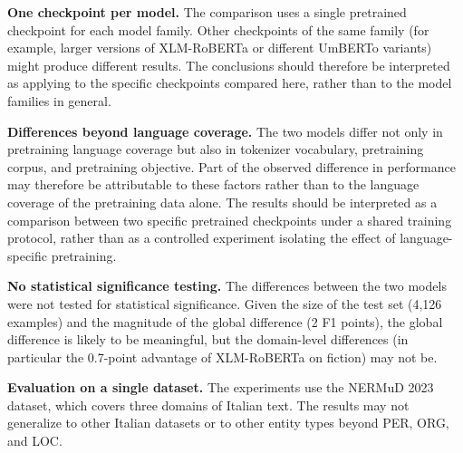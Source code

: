 \textbf{One checkpoint per model.} The comparison uses a single pretrained checkpoint for each model family. Other checkpoints of the same family (for example, larger versions of XLM-RoBERTa or different UmBERTo variants) might produce different results. The conclusions should therefore be interpreted as applying to the specific checkpoints compared here, rather than to the model families in general.

\textbf{Differences beyond language coverage.} The two models differ not only in pretraining language coverage but also in tokenizer vocabulary, pretraining corpus, and pretraining objective. Part of the observed difference in performance may therefore be attributable to these factors rather than to the language coverage of the pretraining data alone. The results should be interpreted as a comparison between two specific pretrained checkpoints under a shared training protocol, rather than as a controlled experiment isolating the effect of language-specific pretraining.

\textbf{No statistical significance testing.} The differences between the two models were not tested for statistical significance. Given the size of the test set (4,126 examples) and the magnitude of the global difference (2 F1 points), the global difference is likely to be meaningful, but the domain-level differences (in particular the 0.7-point advantage of XLM-RoBERTa on fiction) may not be.

\textbf{Evaluation on a single dataset.} The experiments use the NERMuD 2023 dataset, which covers three domains of Italian text. The results may not generalize to other Italian datasets or to other entity types beyond PER, ORG, and LOC.

